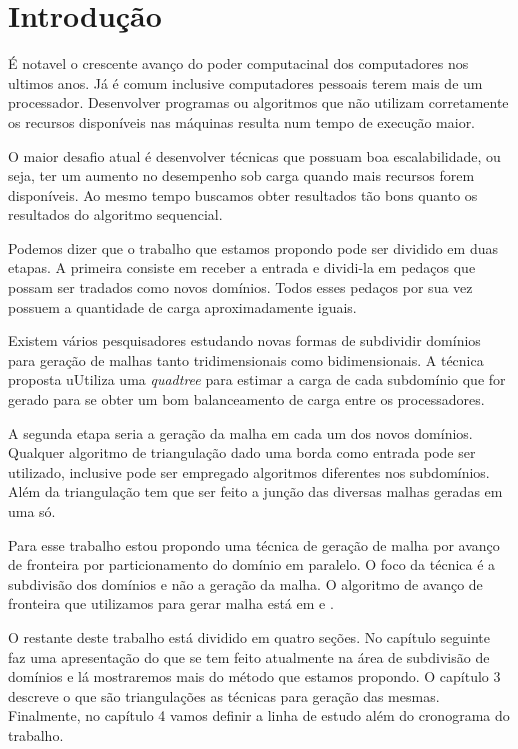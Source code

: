 \cleardoublepage
\pagestyle{fancy}

\chapter{Introdução}\label{intro}
É notavel o crescente avanço do poder computacinal dos computadores nos ultimos anos. Já é comum inclusive computadores pessoais terem mais de um processador. Desenvolver programas ou algoritmos que não utilizam corretamente os recursos disponíveis nas máquinas resulta num tempo de execução maior.

O maior desafio atual é desenvolver técnicas que possuam boa escalabilidade, ou seja, ter um aumento no desempenho sob carga quando mais recursos forem disponíveis. Ao mesmo tempo buscamos obter resultados tão bons quanto os resultados do algoritmo sequencial.

Podemos dizer que o trabalho que estamos propondo pode ser dividido em duas etapas. A primeira consiste em receber a entrada e dividi-la em pedaços que possam ser tradados como novos domínios. Todos esses pedaços por sua vez possuem a quantidade de carga aproximadamente iguais.

Existem vários pesquisadores estudando novas formas de subdividir domínios para geração de malhas tanto tridimensionais como bidimensionais. A técnica proposta uUtiliza uma \textit{quadtree} para estimar a carga de cada subdomínio que for gerado para se obter um bom balanceamento de carga entre os processadores.

A segunda etapa seria a geração da malha em cada um dos novos domínios. Qualquer algoritmo de triangulação dado uma borda como entrada pode ser utilizado, inclusive pode ser empregado algoritmos diferentes nos subdomínios. Além da triangulação tem que ser feito a junção das diversas malhas geradas em uma só.

Para esse trabalho estou propondo uma técnica de geração de malha por avanço de fronteira por particionamento do domínio em paralelo. O foco da técnica é a subdivisão dos domínios e não a geração da malha. O algoritmo de avanço de fronteira que utilizamos para gerar malha está em \cite{bib:Miranda99} e \cite{bib:Cavalcante-Neto01}.

O restante deste trabalho está dividido em quatro seções. No capítulo seguinte faz uma apresentação do que se tem feito atualmente na área de subdivisão de domínios e lá mostraremos mais do método que estamos propondo. O capítulo 3 descreve o que são triangulações as técnicas para geração das mesmas. Finalmente, no capítulo 4 vamos definir a linha de estudo além do cronograma do trabalho.


